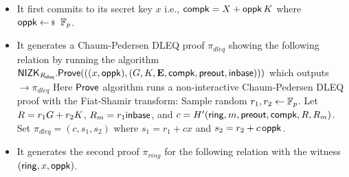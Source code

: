 \begin{itemize}
\begin{itemize}
		\item It first commits to its secret key $
		x$ i.e., $ \mathsf{compk} = X + \mathsf{oppk} \, K $ where $ \openpk \leftsample \FF_p $.
		\item It generates a Chaum-Pedersen DLEQ proof $ \pi_{dleq} $ showing the following relation by running the algorithm $ {\mathsf{NIZK}}_{R_{\mathsf{dleq}}}.{\mathsf{Prove}}(((x, \mathsf{oppk}), (G, K,{\mathbf{E}},\mathsf{compk},{\mathsf{preout}},{\mathsf{inbase}}))) $ which outputs $ \rightarrow \pi_{dleq}$
		Here $ {\mathsf{Prove}} $ algorithm runs a non-interactive Chaum-Pedersen DLEQ proof with the Fiat-Shamir transform:  Sample random $r_1, r_2 \leftarrow \mathbb{F}_p$.
		Let $R = r_1 G + r_2 K$, $R_m = r_1 {\mathsf{inbase}}$, and
		$c = H'(\mathsf{ring}, m, {\mathsf{preout}},\mathsf{compk},R,R_m)$.
		Set $\pi_{dleq} = (c,s_1,s_2)$ where $s_1 = r_1 + c x$ and $s_2= r_2 + c \, \mathsf{oppk}$.
		\item %
		It generates the second proof $ \pi_{ring} $ for the following relation with  the witness $ (\mathsf{ring}, x, \mathsf{oppk}) $. 		
		
		

\end{itemize}
\end{itemize}
